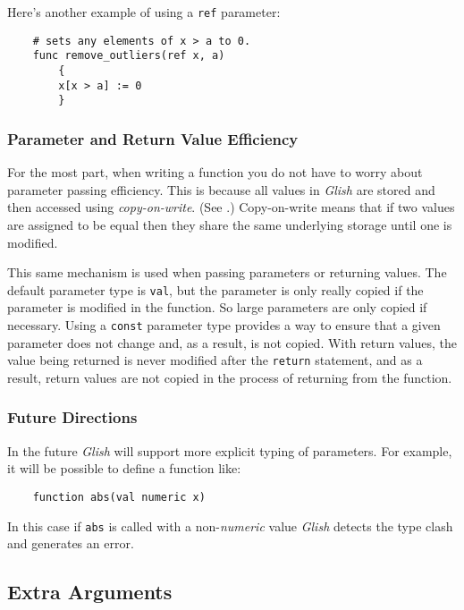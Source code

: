 Here's another example of using a {\tt ref} parameter:
\begin{verbatim}
    # sets any elements of x > a to 0.
    func remove_outliers(ref x, a)
        {
        x[x > a] := 0
        }
\end{verbatim}

\subsubsection{Parameter and Return Value Efficiency} 
\label{passing-efficiency}
For the most part, when  writing a function you do not  have to worry
about parameter passing efficiency. This is because all values in {\em
Glish} are stored and then accessed using {\em copy-on-write}.
(See .)  Copy-on-write means that if two 
values are assigned to be equal then they  share the 
same underlying storage until one is modified.

This same mechanism is used when passing parameters or returning values.
The default parameter type is {\tt val}, but the parameter is only really
copied if the parameter is modified in the function. So large parameters are
only copied if necessary. Using a {\tt const} parameter type provides a way
to ensure that a given parameter does not change and, as a result, is not
copied. With return values, the value being returned is never modified 
after the {\tt return} statement, and as a result, return values are
not copied in the process of returning from the function.
\subsubsection{Future Directions} 
In the future {\em Glish} will support more explicit typing of parameters.
For example, it will be possible to define a function like:
\begin{verbatim}
    function abs(val numeric x)
\end{verbatim}
In this case if {\tt abs} is called with a non-{\em numeric} value
{\em Glish} detects the type clash and generates an error.

\subsection{Extra Arguments}
\label{ellipsis}

